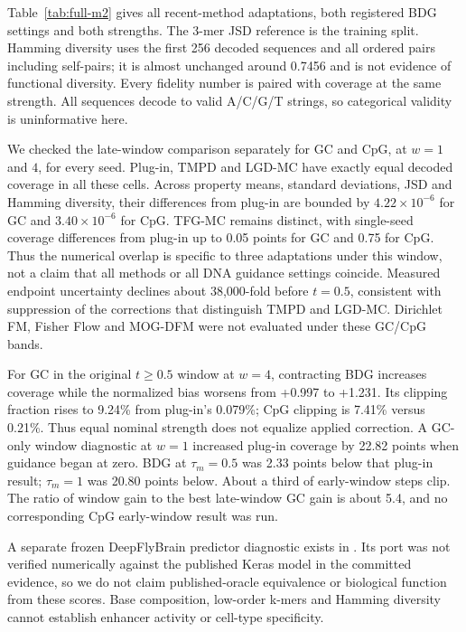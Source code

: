 \documentclass{article}
\begin{document}
Table~\ref{tab:full-m2} gives all recent-method adaptations, both registered BDG settings and both strengths. The 3-mer JSD reference is the training split. Hamming diversity uses the first 256 decoded sequences and all ordered pairs including self-pairs; it is almost unchanged around 0.7456 and is not evidence of functional diversity. Every fidelity number is paired with coverage at the same strength. All sequences decode to valid A/C/G/T strings, so categorical validity is uninformative here.

We checked the late-window comparison separately for GC and CpG, at $w=1$ and $4$, for every seed. Plug-in, TMPD and LGD-MC have exactly equal decoded coverage in all these cells. Across property means, standard deviations, JSD and Hamming diversity, their differences from plug-in are bounded by $4.22\times10^{-6}$ for GC and $3.40\times10^{-6}$ for CpG. TFG-MC remains distinct, with single-seed coverage differences from plug-in up to 0.05 points for GC and 0.75 for CpG. Thus the numerical overlap is specific to three adaptations under this window, not a claim that all methods or all DNA guidance settings coincide. Measured endpoint uncertainty declines about 38,000-fold before $t=0.5$, consistent with suppression of the corrections that distinguish TMPD and LGD-MC. Dirichlet FM, Fisher Flow and MOG-DFM were not evaluated under these GC/CpG bands.

For GC in the original $t\ge0.5$ window at $w=4$, contracting BDG increases coverage while the normalized bias worsens from +0.997 to +1.231. Its clipping fraction rises to 9.24\% from plug-in's 0.079\%; CpG clipping is 7.41\% versus 0.21\%. Thus equal nominal strength does not equalize applied correction. A GC-only window diagnostic at $w=1$ increased plug-in coverage by 22.82 points when guidance began at zero. BDG at $\tau_m=0.5$ was 2.33 points below that plug-in result; $\tau_m=1$ was 20.80 points below. About a third of early-window steps clip. The ratio of window gain to the best late-window GC gain is about 5.4, and no corresponding CpG early-window result was run.

A separate frozen DeepFlyBrain predictor diagnostic exists in . Its port was not verified numerically against the published Keras model in the committed evidence, so we do not claim published-oracle equivalence or biological function from these scores. Base composition, low-order k-mers and Hamming diversity cannot establish enhancer activity or cell-type specificity.
\end{document}
